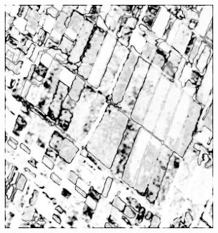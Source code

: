 \begin{figure}[tbp]
\centering
        \begin{subfigure}[b]{0.3\textwidth}
            \includegraphics[width=\textwidth]{Figures/Kron/Conf/P}
            \caption{}
            \label{fig:Pconf}
        \end{subfigure}
        ~
        \begin{subfigure}[b]{0.3\textwidth}

\end{subfigure}
\end{figure}
